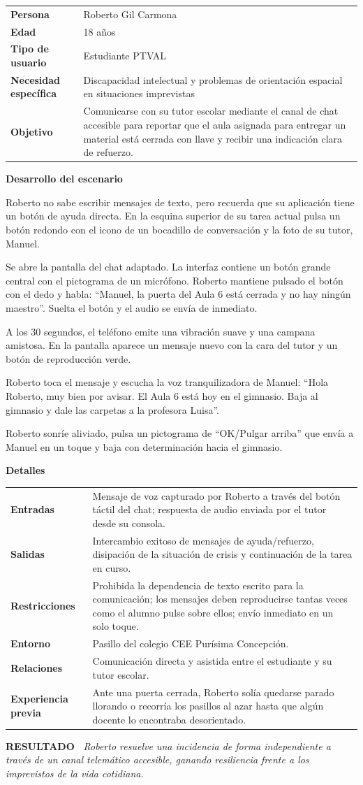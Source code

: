 \documentclass[11pt,a4paper]{article}
\makeatletter
\newcommand{\escenariocard}[6]{%
\needspace{10\baselineskip}
\begin{tcolorbox}[breakable,enhanced,colback=white,colframe=brandgreen,boxrule=0.8pt,arc=3pt,
 left=9pt,right=9pt,top=7pt,bottom=7pt,before skip=10pt,after skip=10pt,
 title={\textbf{\color{white}ESCENARIO #1} \\[1pt] {\small\color{tintgreen}#2}},
 colbacktitle=brandgreen,coltitle=white,fonttitle=\bfseries,boxed title style={colframe=brandgreen}]
{\setlength{\parskip}{0pt}\renewcommand{\arraystretch}{1.35}\rowcolors{1}{tintgreen}{white}\arrayrulecolor{white}
\begin{tabular}{@{\hspace{4pt}}>{\bfseries\color{brandgreen}}p{3.4cm}p{11.4cm}@{}}
#3 \\
\end{tabular}}
\vspace{6pt}
\textbf{\color{brandblue}Desarrollo del escenario}\par\vspace{2pt}
#4
\par\vspace{4pt}
\textbf{\color{brandblue}Detalles}\par\vspace{2pt}
{\setlength{\parskip}{0pt}\renewcommand{\arraystretch}{1.35}\rowcolors{1}{tintblue}{white}\arrayrulecolor{white}
\begin{tabular}{@{\hspace{4pt}}>{\bfseries\color{brandblue}}p{3.4cm}p{11.4cm}@{}}
#5 \\
\end{tabular}}
\vspace{6pt}
\begin{tcolorbox}[colback=tintblue,colframe=brandblue,boxrule=0pt,sharp corners,borderline west={3pt}{0pt}{brandblue},left=8pt,right=8pt,top=5pt,bottom=5pt]
\textbf{\small\color{brandblue}RESULTADO\ } {\small\itshape #6}
\end{tcolorbox}
\end{tcolorbox}
}
\makeatother
\begin{document}
\escenariocard{8}{Resolución de un bloqueo en el taller mediante chat accesible con notas de voz}{%
Persona & Roberto Gil Carmona \\
Edad & 18 años \\
Tipo de usuario & Estudiante PTVAL \\
Necesidad específica & Discapacidad intelectual y problemas de orientación espacial en situaciones imprevistas \\
Objetivo & Comunicarse con su tutor escolar mediante el canal de chat accesible para reportar que el aula asignada para entregar un material está cerrada con llave y recibir una indicación clara de refuerzo.
}{%
Roberto no sabe escribir mensajes de texto, pero recuerda que su aplicación tiene un botón de ayuda directa. En la esquina superior de su tarea actual pulsa un botón redondo con el icono de un bocadillo de conversación y la foto de su tutor, Manuel.

Se abre la pantalla del chat adaptado. La interfaz contiene un botón grande central con el pictograma de un micrófono. Roberto mantiene pulsado el botón con el dedo y habla: ``Manuel, la puerta del Aula 6 está cerrada y no hay ningún maestro''. Suelta el botón y el audio se envía de inmediato.

A los 30 segundos, el teléfono emite una vibración suave y una campana amistosa. En la pantalla aparece un mensaje nuevo con la cara del tutor y un botón de reproducción verde.

Roberto toca el mensaje y escucha la voz tranquilizadora de Manuel: ``Hola Roberto, muy bien por avisar. El Aula 6 está hoy en el gimnasio. Baja al gimnasio y dale las carpetas a la profesora Luisa''.

Roberto sonríe aliviado, pulsa un pictograma de ``OK/Pulgar arriba'' que envía a Manuel en un toque y baja con determinación hacia el gimnasio.
}{%
Entradas & Mensaje de voz capturado por Roberto a través del botón táctil del chat; respuesta de audio enviada por el tutor desde su consola. \\
Salidas & Intercambio exitoso de mensajes de ayuda/refuerzo, disipación de la situación de crisis y continuación de la tarea en curso. \\
Restricciones & Prohibida la dependencia de texto escrito para la comunicación; los mensajes deben reproducirse tantas veces como el alumno pulse sobre ellos; envío inmediato en un solo toque. \\
Entorno & Pasillo del colegio CEE Purísima Concepción. \\
Relaciones & Comunicación directa y asistida entre el estudiante y su tutor escolar. \\
Experiencia previa & Ante una puerta cerrada, Roberto solía quedarse parado llorando o recorría los pasillos al azar hasta que algún docente lo encontraba desorientado.
}{Roberto resuelve una incidencia de forma independiente a través de un canal telemático accesible, ganando resiliencia frente a los imprevistos de la vida cotidiana.}
\end{document}
